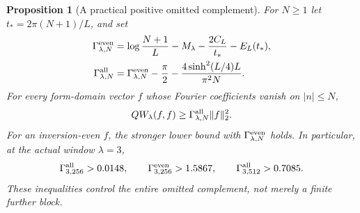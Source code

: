 \documentclass[11pt]{article}
\newtheorem{proposition}[theorem]{Proposition}
\theoremstyle{remark}
\begin{document}
\begin{proposition}[A practical positive omitted complement]
\label{prop:v115-sharp-tail}
For $N\ge1$ let $t_*=2\pi(N+1)/L$, and set
\begin{align}
 \Gamma_{\lambda,N}^{\rm even}
   &=\log\frac{N+1}{L}-M_\lambda
                -\frac{2C_L}{t_*}-E_L(t_*),\notag\\
 \Gamma_{\lambda,N}^{\rm all}
   &=\Gamma_{\lambda,N}^{\rm even}-\frac\pi2
                   -\frac{4\sinh^2(L/4)L}{\pi^2N}.
 \label{eq:v115-sharp-tail}
\end{align}
For every form-domain vector $f$ whose Fourier coefficients vanish on
$|n|\le N$,
\[
 QW_\lambda(f,f)\ge\Gamma_{\lambda,N}^{\rm all}\|f\|_2^2.
\]
For an inversion-even $f$, the stronger lower bound with
$\Gamma_{\lambda,N}^{\rm even}$ holds. In particular, at the actual
window $\lambda=3$,
\begin{equation}\label{eq:v115-lambda3-tail}
 \Gamma_{3,256}^{\rm all}>0.0148,\qquad
 \Gamma_{3,256}^{\rm even}>1.5867,\qquad
 \Gamma_{3,512}^{\rm all}>0.7085.
\end{equation}
These inequalities control the entire omitted complement, not merely a
finite further block.
\end{proposition}
\end{document}
